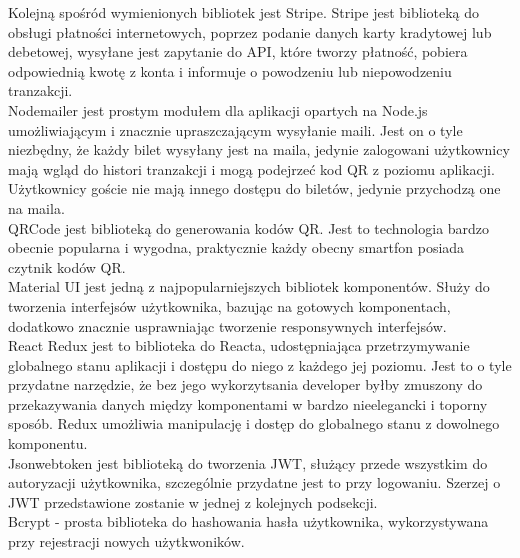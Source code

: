 \documentclass[12pt]{article}
\begin{document}
\begin{sloppypar}
{{    Kolejną spośród wymienionych bibliotek jest Stripe. Stripe jest biblioteką do obsługi płatności internetowych, poprzez podanie danych karty kradytowej lub debetowej, 
    wysyłane jest zapytanie do API, które tworzy płatność, pobiera odpowiednią kwotę z konta i informuje o powodzeniu lub niepowodzeniu tranzakcji.\\

    Nodemailer jest prostym modułem dla aplikacji opartych na Node.js umożliwiającym i znacznie upraszczającym wysyłanie maili. Jest on o tyle niezbędny, że każdy bilet wysyłany jest na maila, 
    jedynie zalogowani użytkownicy mają wgląd do histori tranzakcji i mogą podejrzeć kod QR z poziomu aplikacji. Użytkownicy goście nie mają innego dostępu do biletów, jedynie 
    przychodzą one na maila.\\

    QRCode jest biblioteką do generowania kodów QR. Jest to technologia bardzo obecnie popularna i wygodna, praktycznie każdy obecny smartfon posiada czytnik kodów QR.\\

    Material UI jest jedną z najpopularniejszych bibliotek komponentów. Służy do tworzenia interfejsów użytkownika, bazując na gotowych komponentach, dodatkowo znacznie 
    usprawniając tworzenie responsywnych interfejsów.\\

    React Redux jest to biblioteka do Reacta, udostępniająca przetrzymywanie globalnego stanu aplikacji i dostępu do niego z każdego jej poziomu. Jest to o tyle przydatne 
    narzędzie, że bez jego wykorzytsania developer byłby zmuszony do przekazywania danych między komponentami w bardzo nieelegancki i toporny sposób. Redux umożliwia 
    manipulację i dostęp do globalnego stanu z dowolnego komponentu.\\

    Jsonwebtoken jest biblioteką do tworzenia JWT, służący przede wszystkim do autoryzacji użytkownika, szczególnie przydatne jest to przy logowaniu. Szerzej o JWT 
    przedstawione zostanie w jednej z kolejnych podsekcji.\\

    Bcrypt - prosta biblioteka do hashowania hasła użytkownika, wykorzystywana przy rejestracji nowych użytkwoników.
  }
}
\end{sloppypar}
\end{document}
